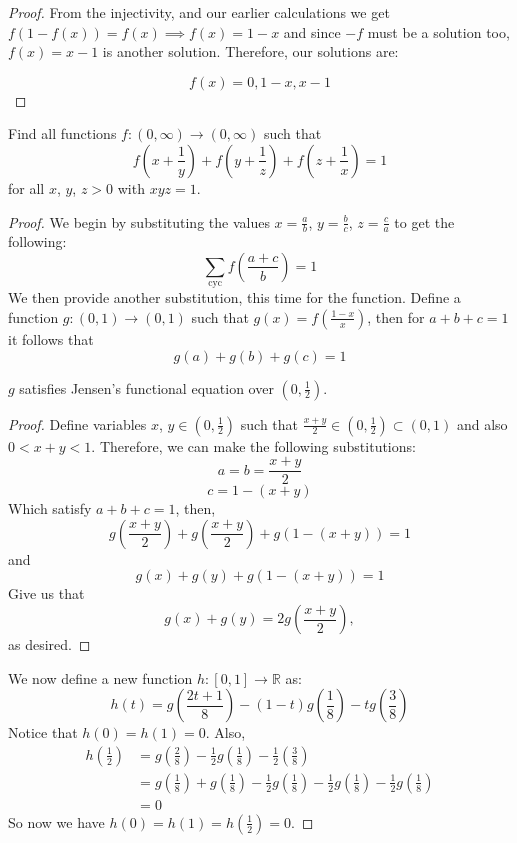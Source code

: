 \documentclass[11pt]{scrartcl}
\begin{document}
\begin{proof}
  From the injectivity, and our earlier calculations we get $f(1-f(x)) = f(x) \implies f(x) = 1-x$ and since $-f$ must be a solution too, 
  $f(x) = x-1$ is another solution. Therefore, our solutions are:

  \[
  \boxed{f(x) = 0, 1-x, x-1}
  \]
\end{proof}

\begin{problem}
  [USAMO 2018]
  Find all functions $f: (0, \infty) \rightarrow (0, \infty)$ such that
  \[
  f\left( x + \frac 1y \right) + f\left( y + \frac 1z \right) + f\left( z + \frac 1x \right) = 1
  \]
  for all $x$, $y$, $z > 0$ with $xyz = 1$.
\end{problem}

\begin{proof}
  We begin by substituting the values $x=\frac ab$, $y=\frac bc$, $z=\frac ca$ to get the following:
  \[
  \sum_{\text{cyc}} f\left( \frac{a+c}{b} \right) = 1
  \]
  We then provide another substitution, this time for the function. Define a function $g: (0, 1) \rightarrow (0, 1)$ such that
  $g(x) = f(\frac{1-x}{x})$, then for $a + b + c = 1$ it follows that
  \[
  g(a) + g(b) + g(c) = 1
  \]
  \begin{claim}
    $g$ satisfies Jensen's functional equation over $(0, \frac 12)$.
    \begin{proof}
      Define variables $x$, $y \in (0, \frac 12)$ such that $\frac{x+y}{2} \in (0, \frac 12) \subset (0, 1)$ and also $0 < x+y < 1$.
      Therefore, we can make the following substitutions:
      \[
      a = b = \frac{x+y}{2}
      \]
      \[
      c = 1-(x+y)
      \]
      Which satisfy $a+b+c=1$, then,
      \[
      g\left( \frac{x+y}{2} \right) + g\left( \frac{x+y}{2} \right) + g(1-(x+y)) = 1
      \]
      and
      \[
      g\left( x \right) + g\left( y \right) + g(1-(x+y)) = 1
      \]
      Give us that
      \[
      g(x) + g(y) = 2g\left( \frac{x+y}{2} \right),
      \]
      as desired.
    \end{proof}
  \end{claim}
  We now define a new function $h: [0, 1] \rightarrow \mathbb{R}$ as:
  \[
  h(t) = g \left( \frac{2t+1}{8} \right) - (1-t) g\left( \frac 18\right) - tg\left( \frac 38 \right)
  \]
  Notice that $h(0) = h(1) = 0$. Also,
  \begin{align*}
    h\left( \frac 12 \right) &= g \left( \frac 28 \right) - \frac 12 g\left( \frac 18 \right) - \frac 12 \left( \frac 38 \right) \\
    &= g \left( \frac 18 \right) + g \left( \frac 18 \right) - \frac 12 g \left( \frac 18 \right) - \frac 12 g \left( \frac 18 \right) - \frac 12 g \left( \frac 18 \right) \\
    &= 0
  \end{align*}
  So now we have $h(0) = h(1) = h(\frac 12) = 0$.
\end{proof}
\end{document}
